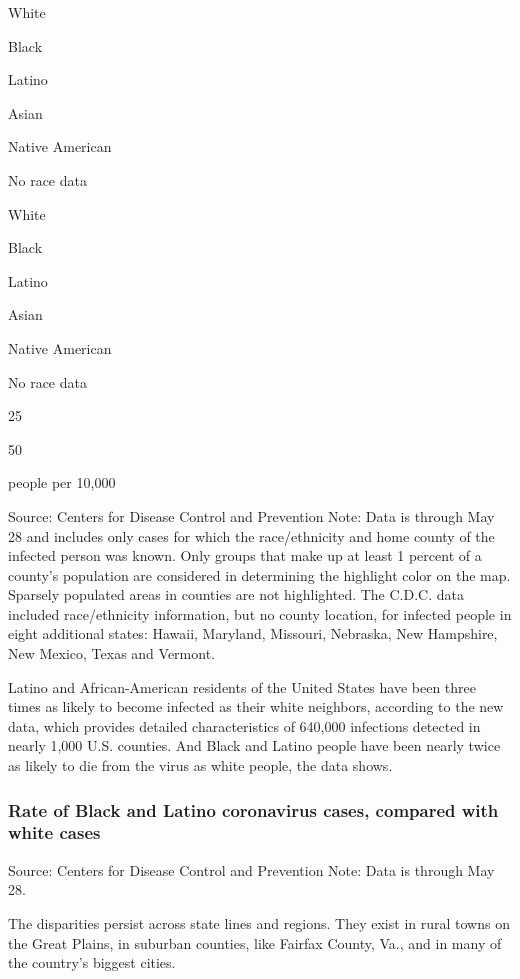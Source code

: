 White

Black

Latino

Asian

Native American

No race data

White

Black

Latino

Asian

Native American

No race data

25

50

people per 10,000

Source: Centers for Disease Control and Prevention \textbar{} Note: Data
is through May 28 and includes only cases for which the race/ethnicity
and home county of the infected person was known. Only groups that make
up at least 1 percent of a county's population are considered in
determining the highlight color on the map. Sparsely populated areas in
counties are not highlighted. The C.D.C. data included race/ethnicity
information, but no county location, for infected people in eight
additional states: Hawaii, Maryland, Missouri, Nebraska, New Hampshire,
New Mexico, Texas and Vermont.

Latino and African-American residents of the United States have been
three times as likely to become infected as their white neighbors,
according to the new data, which provides detailed characteristics of
640,000 infections detected in nearly 1,000 U.S. counties. And Black and
Latino people have been nearly twice as likely to die from the virus as
white people, the data shows.

\hypertarget{rate-of-black-and-latino-coronavirus-cases-compared-with-white-cases}{%
\subsubsection{Rate of Black and Latino coronavirus cases, compared with
white
cases}\label{rate-of-black-and-latino-coronavirus-cases-compared-with-white-cases}}

Source: Centers for Disease Control and Prevention \textbar{} Note: Data
is through May 28.

The disparities persist across state lines and regions. They exist in
rural towns on the Great Plains, in suburban counties, like Fairfax
County, Va., and in many of the country's biggest cities.

